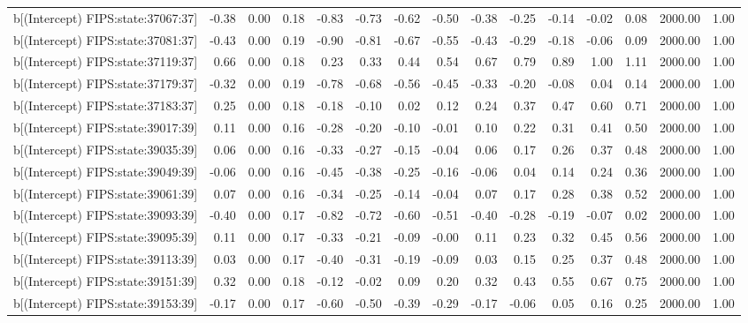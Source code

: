 \begin{table}[ht]
\begin{tabular}{rrrrrrrrrrrrrrr}
  b[(Intercept) FIPS:state:37067:37] & -0.38 & 0.00 & 0.18 & -0.83 & -0.73 & -0.62 & -0.50 & -0.38 & -0.25 & -0.14 & -0.02 & 0.08 & 2000.00 & 1.00 \\ 
  b[(Intercept) FIPS:state:37081:37] & -0.43 & 0.00 & 0.19 & -0.90 & -0.81 & -0.67 & -0.55 & -0.43 & -0.29 & -0.18 & -0.06 & 0.09 & 2000.00 & 1.00 \\ 
  b[(Intercept) FIPS:state:37119:37] & 0.66 & 0.00 & 0.18 & 0.23 & 0.33 & 0.44 & 0.54 & 0.67 & 0.79 & 0.89 & 1.00 & 1.11 & 2000.00 & 1.00 \\ 
  b[(Intercept) FIPS:state:37179:37] & -0.32 & 0.00 & 0.19 & -0.78 & -0.68 & -0.56 & -0.45 & -0.33 & -0.20 & -0.08 & 0.04 & 0.14 & 2000.00 & 1.00 \\ 
  b[(Intercept) FIPS:state:37183:37] & 0.25 & 0.00 & 0.18 & -0.18 & -0.10 & 0.02 & 0.12 & 0.24 & 0.37 & 0.47 & 0.60 & 0.71 & 2000.00 & 1.00 \\ 
  b[(Intercept) FIPS:state:39017:39] & 0.11 & 0.00 & 0.16 & -0.28 & -0.20 & -0.10 & -0.01 & 0.10 & 0.22 & 0.31 & 0.41 & 0.50 & 2000.00 & 1.00 \\ 
  b[(Intercept) FIPS:state:39035:39] & 0.06 & 0.00 & 0.16 & -0.33 & -0.27 & -0.15 & -0.04 & 0.06 & 0.17 & 0.26 & 0.37 & 0.48 & 2000.00 & 1.00 \\ 
  b[(Intercept) FIPS:state:39049:39] & -0.06 & 0.00 & 0.16 & -0.45 & -0.38 & -0.25 & -0.16 & -0.06 & 0.04 & 0.14 & 0.24 & 0.36 & 2000.00 & 1.00 \\ 
  b[(Intercept) FIPS:state:39061:39] & 0.07 & 0.00 & 0.16 & -0.34 & -0.25 & -0.14 & -0.04 & 0.07 & 0.17 & 0.28 & 0.38 & 0.52 & 2000.00 & 1.00 \\ 
  b[(Intercept) FIPS:state:39093:39] & -0.40 & 0.00 & 0.17 & -0.82 & -0.72 & -0.60 & -0.51 & -0.40 & -0.28 & -0.19 & -0.07 & 0.02 & 2000.00 & 1.00 \\ 
  b[(Intercept) FIPS:state:39095:39] & 0.11 & 0.00 & 0.17 & -0.33 & -0.21 & -0.09 & -0.00 & 0.11 & 0.23 & 0.32 & 0.45 & 0.56 & 2000.00 & 1.00 \\ 
  b[(Intercept) FIPS:state:39113:39] & 0.03 & 0.00 & 0.17 & -0.40 & -0.31 & -0.19 & -0.09 & 0.03 & 0.15 & 0.25 & 0.37 & 0.48 & 2000.00 & 1.00 \\ 
  b[(Intercept) FIPS:state:39151:39] & 0.32 & 0.00 & 0.18 & -0.12 & -0.02 & 0.09 & 0.20 & 0.32 & 0.43 & 0.55 & 0.67 & 0.75 & 2000.00 & 1.00 \\ 
  b[(Intercept) FIPS:state:39153:39] & -0.17 & 0.00 & 0.17 & -0.60 & -0.50 & -0.39 & -0.29 & -0.17 & -0.06 & 0.05 & 0.16 & 0.25 & 2000.00 & 1.00 \\ 

\end{tabular}
\end{table}
